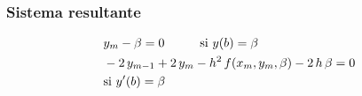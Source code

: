 \documentclass[12pt]{beamer}
\begin{document}
\begin{frame}
\frametitle{Sistema resultante}
\begin{eqnarray}
\begin{aligned}
&y_{m} - \beta = 0 \hspace{1cm} \text{si } y (b) = \beta \\
&-2 \, y_{m-1} + 2 \, y_{m} - h^{2} \, f (x_{m}, y_{m}, \beta) - 2 \, h \, \beta = 0 \\
&\text{si } {y}^{\prime} (b) = \beta
\end{aligned}
\label{eq:ecuacion_08_11_c}
\end{eqnarray}
\end{frame}
\end{document}
